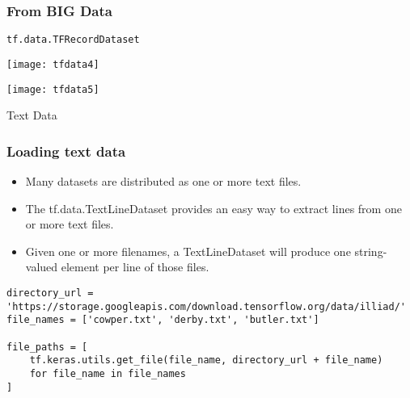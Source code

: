 \begin{frame}[fragile]\frametitle{From BIG Data}
\lstinline|tf.data.TFRecordDataset|

\begin{center}

\texttt{[image: tfdata4]}

\texttt{[image: tfdata5]}


\end{center}
\end{frame}

\begin{frame}
  \begin{center}
    {\Large Text Data}
	
  \end{center}
\end{frame}

\begin{frame}[fragile]\frametitle{Loading text data}

\begin{itemize}
\item Many datasets are distributed as one or more text files. 
\item The tf.data.TextLineDataset provides an easy way to extract lines from one or more text files. 
\item Given one or more filenames, a TextLineDataset will produce one string-valued element per line of those files.
\end{itemize}


\begin{lstlisting}
directory_url = 'https://storage.googleapis.com/download.tensorflow.org/data/illiad/'
file_names = ['cowper.txt', 'derby.txt', 'butler.txt']

file_paths = [
    tf.keras.utils.get_file(file_name, directory_url + file_name)
    for file_name in file_names
]

\end{lstlisting}
\end{frame}

